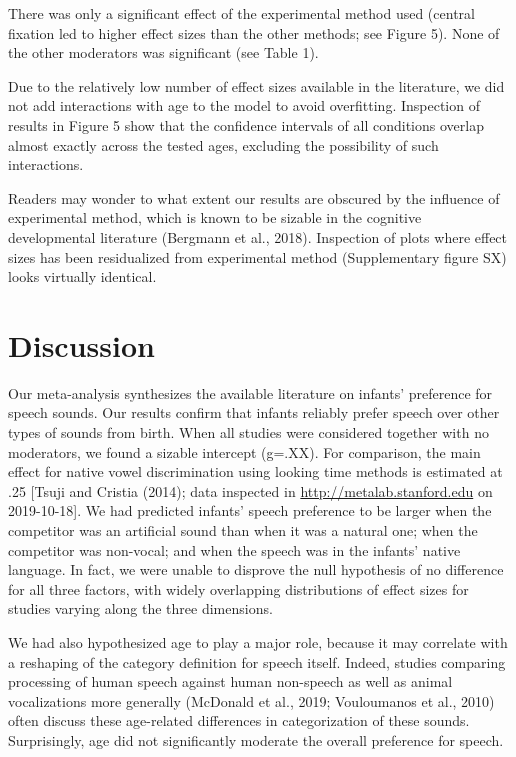 \documentclass[man]{apa6}
\begin{document}
There was only a significant effect of the experimental method used
(central fixation led to higher effect sizes than the other methods; see
Figure 5). None of the other moderators was significant (see Table 1).

Due to the relatively low number of effect sizes available in the
literature, we did not add interactions with age to the model to avoid
overfitting. Inspection of results in Figure 5 show that the confidence
intervals of all conditions overlap almost exactly across the tested
ages, excluding the possibility of such interactions.

Readers may wonder to what extent our results are obscured by the
influence of experimental method, which is known to be sizable in the
cognitive developmental literature (Bergmann et al., 2018). Inspection
of plots where effect sizes has been residualized from experimental
method (Supplementary figure SX) looks virtually identical.

\section{Discussion}\label{discussion}

Our meta-analysis synthesizes the available literature on infants'
preference for speech sounds. Our results confirm that infants reliably
prefer speech over other types of sounds from birth. When all studies
were considered together with no moderators, we found a sizable
intercept (g=.XX). For comparison, the main effect for native vowel
discrimination using looking time methods is estimated at .25 {[}Tsuji
and Cristia (2014); data inspected in \url{http://metalab.stanford.edu}
on 2019-10-18{]}. We had predicted infants' speech preference to be
larger when the competitor was an artificial sound than when it was a
natural one; when the competitor was non-vocal; and when the speech was
in the infants' native language. In fact, we were unable to disprove the
null hypothesis of no difference for all three factors, with widely
overlapping distributions of effect sizes for studies varying along the
three dimensions.

We had also hypothesized age to play a major role, because it may
correlate with a reshaping of the category definition for speech itself.
Indeed, studies comparing processing of human speech against human
non-speech as well as animal vocalizations more generally (McDonald et
al., 2019; Vouloumanos et al., 2010) often discuss these age-related
differences in categorization of these sounds. Surprisingly, age did not
significantly moderate the overall preference for speech.
\end{document}
